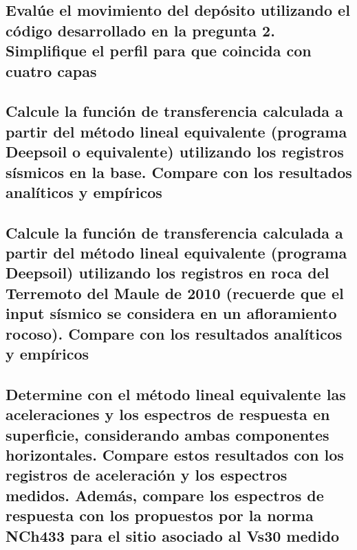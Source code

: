 \subsection{Evalúe el movimiento del depósito utilizando el código desarrollado en la pregunta 2. Simplifique el perfil para que coincida con cuatro capas}


\subsection{Calcule la función de transferencia calculada a partir del método lineal equivalente (programa Deepsoil o equivalente) utilizando los registros sísmicos en la base. Compare con los resultados analíticos y empíricos}


\subsection{Calcule la función de transferencia calculada a partir del método lineal equivalente (programa Deepsoil) utilizando los registros en roca del Terremoto del Maule de 2010 (recuerde que el input sísmico se considera en un afloramiento rocoso). Compare con los resultados analíticos y empíricos}


\subsection{Determine con el método lineal equivalente las aceleraciones y los espectros de respuesta en superficie, considerando ambas componentes horizontales. Compare estos resultados con los registros de aceleración y los espectros medidos. Además, compare los espectros de respuesta con los propuestos por la norma NCh433 para el sitio asociado al Vs30 medido}
